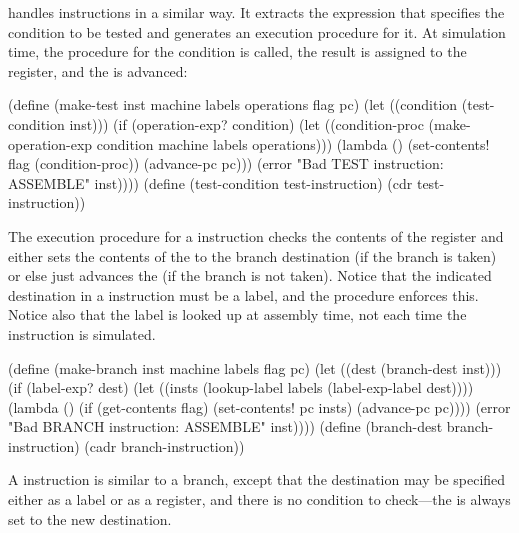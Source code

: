  handles  instructions in a similar way.  It
extracts the expression that specifies the condition to be tested and generates
an execution procedure for it.  At simulation time, the procedure for the
condition is called, the result is assigned to the  register, and
the  is advanced:

\begin{codeBlock}
(define (make-test inst
                   machine
                   labels
                   operations
                   flag
                   pc)
  (let ((condition (test-condition inst)))
    (if (operation-exp? condition)
        (let ((condition-proc
                (make-operation-exp
                  condition
                  machine
                  labels
                  operations)))
          (lambda ()
            (set-contents! flag (condition-proc))
            (advance-pc pc)))
        (error
          "Bad TEST instruction: ASSEMBLE"
          inst))))
(define (test-condition test-instruction)
  (cdr test-instruction))
\end{codeBlock}

\noindent
The execution procedure for a  instruction checks the contents of
the  register and either sets the contents of the  to the
branch destination (if the branch is taken) or else just advances the 
(if the branch is not taken).  Notice that the indicated destination in a
 instruction must be a label, and the  procedure
enforces this.  Notice also that the label is looked up at assembly time, not
each time the  instruction is simulated.

\begin{codeBlock}
(define (make-branch inst machine labels flag pc)
  (let ((dest (branch-dest inst)))
    (if (label-exp? dest)
        (let ((insts
                (lookup-label
                  labels
                  (label-exp-label dest))))
          (lambda ()
            (if (get-contents flag)
                (set-contents! pc insts)
                (advance-pc pc))))
        (error "Bad BRANCH instruction: ASSEMBLE"
               inst))))
(define (branch-dest branch-instruction)
  (cadr branch-instruction))
\end{codeBlock}

\noindent
A  instruction is similar to a branch, except that the destination
may be specified either as a label or as a register, and there is no condition
to check---the  is always set to the new destination.

